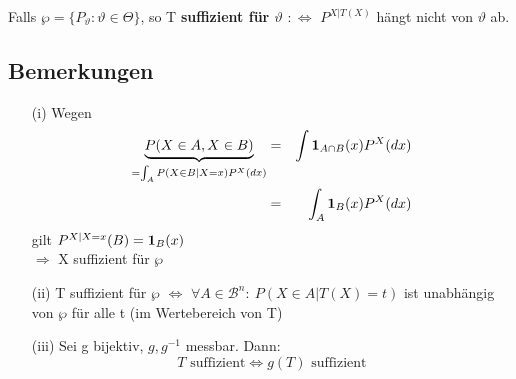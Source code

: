 \documentclass[a4paper,11pt,twoside,titlepage]{article}
\newcommand\BB{ \mathcal{B} } %
\newcommand{\ind}{\text{\bf{1}}} %
\begin{document}
Falls $\wp=\{P_\vartheta:\vartheta\in\Theta\}$, so T \textbf{suffizient für $\vartheta$} $:\Leftrightarrow$ $P^{X|T(X)}$ hängt nicht von $\vartheta$ ab.

\subsection{Bemerkungen}
\begin{itemize}
\item[(i)] Wegen
\begin{eqnarray*}
\underbrace{P(X\in A,X\in B)}_{=\int_A P(X\in B|X=x)P^X(dx)}&=&\int \ind_{A\cap B}(x)P^X(dx)\\
&=&\int_A\ind_B(x)P^X(dx)\end{eqnarray*}
gilt $P^{X|X=x}(B)=\ind_B(x)$\\
$\Rightarrow$ X suffizient für $\wp$
\item[(ii)] T suffizient für $\wp$ $\Leftrightarrow$ $\forall A\in\BB^n:\ P(X\in A|T(X)=t)$ ist unabhängig von $\wp$ für alle t (im Wertebereich von T)
\item[(iii)] Sei g bijektiv, $g,g^{-1}$ messbar. Dann:
\[T \mbox{ suffizient}\Leftrightarrow g(T)\mbox{ suffizient}\]
\end{itemize}
\end{document}
